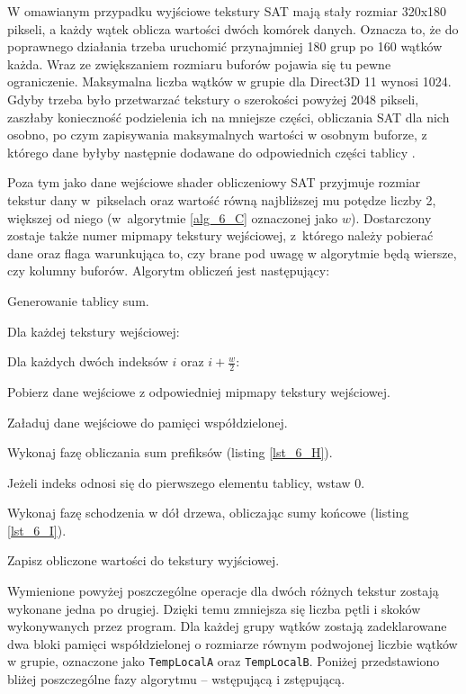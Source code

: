 		W omawianym przypadku wyjściowe tekstury SAT mają stały rozmiar 320x180 pikseli, a każdy wątek oblicza wartości dwóch komórek danych. Oznacza to, że do poprawnego działania trzeba uruchomić przynajmniej 180 grup po 160 wątków każda. Wraz ze zwiększaniem rozmiaru buforów pojawia się tu pewne ograniczenie. Maksymalna liczba wątków w grupie dla Direct3D 11 wynosi 1024. Gdyby trzeba było przetwarzać tekstury o szerokości powyżej 2048 pikseli, zaszłaby konieczność podzielenia ich na mniejsze części, obliczania SAT dla nich osobno, po czym zapisywania maksymalnych wartości w osobnym buforze, z którego dane byłyby następnie dodawane do odpowiednich części tablicy \cite{sat}.
		
		Poza tym jako dane wejściowe shader obliczeniowy SAT przyjmuje rozmiar tekstur dany w~pikselach oraz wartość równą najbliższej mu potędze liczby 2, większej od niego (w~algorytmie \ref{alg_6_C} oznaczonej jako \(w\)). Dostarczony zostaje także numer mipmapy tekstury wejściowej, z~którego należy pobierać dane oraz flaga warunkująca to, czy brane pod uwagę w algorytmie będą wiersze, czy kolumny buforów. Algorytm obliczeń jest następujący: 
		
		\begin{algorithm}[H]
			\label{alg_6_C}
			\caption{Generowanie tablicy sum.}	
			Dla każdej tekstury wejściowej:
			
			\Indp
			
			Dla każdych dwóch indeksów \(i\) oraz \(i + \frac{w}{2}\):
			
			\Indp
				
				Pobierz dane wejściowe z odpowiedniej mipmapy tekstury wejściowej.
				
				Załaduj dane wejściowe do pamięci współdzielonej.
				
				Wykonaj fazę obliczania sum prefiksów (listing \ref{lst_6_H}).
				
				Jeżeli indeks odnosi się do pierwszego elementu tablicy, wstaw 0.
				
				Wykonaj fazę schodzenia w dół drzewa, obliczając sumy końcowe (listing \ref{lst_6_I}).
				
				Zapisz obliczone wartości do tekstury wyjściowej. 
			
			\Indm		
			
			\Indm
		\end{algorithm}
	
		Wymienione powyżej poszczególne operacje dla dwóch różnych tekstur zostają wykonane jedna po drugiej. Dzięki temu zmniejsza się liczba pętli i skoków wykonywanych przez program. Dla każdej grupy wątków zostają zadeklarowane dwa bloki pamięci współdzielonej o rozmiarze równym podwojonej liczbie wątków w grupie, oznaczone jako \texttt{TempLocalA} oraz \texttt{TempLocalB}. Poniżej przedstawiono bliżej poszczególne fazy algorytmu -- wstępującą i zstępującą.\pagebreak
		
